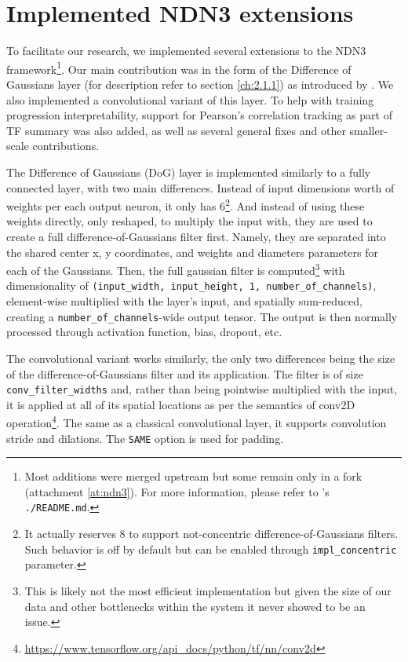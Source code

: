 \section{Implemented NDN3 extensions}\label{ch:3.2}

To facilitate our research, we implemented several extensions to the NDN3 framework\footnote{Most additions were merged upstream but some remain only in a fork (attachment \ref{at:ndn3}). For more information, please refer to 's \texttt{./README.md}.}. Our main contribution was in the form of the Difference of Gaussians layer (for description refer to section \ref{ch:2.1.1}) as introduced by \cite{antolik}. We also implemented a convolutional variant of this layer. To help with training progression interpretability, support for Pearson’s correlation tracking as part of TF summary was also added, as well as several general fixes and other smaller-scale contributions.

The Difference of Gaussians (DoG) layer is implemented similarly to a fully connected layer, with two main differences. Instead of input dimensions worth of weights per each output neuron, it only has 6\footnote{It actually reserves 8 to support not-concentric difference-of-Gaussians filters. Such behavior is off by default but can be enabled through \texttt{impl\_concentric} parameter.}. And instead of using these weights directly, only reshaped, to multiply the input with, they are used to create a full difference-of-Gaussians filter first. Namely, they are separated into the shared center x, y coordinates, and weights and diameters parameters for each of the Gaussians. Then, the full gaussian filter is computed\footnote{This is likely not the most efficient implementation but given the size of our data and other bottlenecks within the system it never showed to be an issue.} with dimensionality of \texttt{(input\_width, input\_height, 1, number\_of\_channels)}, element-wise multiplied with the layer’s input, and spatially sum-reduced, creating a \texttt{number\_of\_channels}-wide output tensor. The output is then normally processed through activation function, bias, dropout, etc.

The convolutional variant works similarly, the only two differences being the size of the difference-of-Gaussians filter and its application. The filter is of size \texttt{conv\_filter\_widths} and, rather than being pointwise multiplied with the input, it is applied at all of its spatial locations as per the semantics of conv2D operation\footnote{\href{https://www.tensorflow.org/api_docs/python/tf/nn/conv2d}{https://www.tensorflow.org/api\_docs/python/tf/nn/conv2d}}. The same as a classical convolutional layer, it supports convolution stride and dilations. The \texttt{SAME} option is used for padding. 

